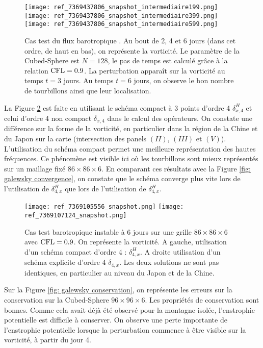 \begin{figure}[htbp]
\begin{center}
\texttt{[image: ref\_7369437806\_snapshot\_intermediaire199.png]}
\texttt{[image: ref\_7369437806\_snapshot\_intermediaire399.png]}
\texttt{[image: ref\_7369437806\_snapshot\_intermediaire599.png]}
\end{center}
\caption{Cas test du flux barotropique \cite{Galewsky2004}. Au bout de 2, 4 et 6 jours (dans cet ordre, de haut en bas), on représente la vorticité. Le paramètre de la Cubed-Sphere est $N=128$, le pas de temps est calculé grâce à la relation $\text{CFL}=0.9$. La perturbation apparaît sur la vorticité au temps $t=3$ jours. Au temps $t=6$ jours, on observe le bon nombre de tourbillons ainsi que leur localisation.}
\label{fig: galewsky 246}
\end{figure}

La Figure \ref{fig: galewsky compact/explicite} est faite en utilisant le schéma compact à 3 points d'ordre 4 $\delta_{x,4}^H$ et celui d'ordre 4 non compact $\delta_{x,4}$ dans le calcul des opérateurs. On constate une différence sur la forme de la vorticité, en particulier dans la région de la Chine et du Japon sur la carte (intersection des panels $(II)$, $(III)$ et $(V)$). L'utilisation du schéma compact permet une meilleure représentation des hautes fréquences. Ce phénomène est visible ici où les tourbillons sont mieux représentés sur un maillage fixé $86 \times 86 \times 6$. En comparant ces résultats avec la Figure \ref{fig: galewsky convergence}, on constate que le schéma converge plus vite lors de l'utilisation de $\delta_{4,x}^H$ que lors de l'utilisation de $\delta_{4,x}^H$.

\begin{figure}[htbp]
\begin{center}
\texttt{[image: ref\_7369105556\_snapshot.png]}
\texttt{[image: ref\_7369107124\_snapshot.png]}
\end{center}
\caption{Cas test barotropique instable \cite{Galewsky2004} à 6 jours sur une grille $86 \times 86 \times 6$ avec $\text{CFL}=0.9$. On représente la vorticité. A gauche, utilisation d'un schéma compact d'ordre 4 : $\delta_{4,x}^H$. A droite utilisation d'un schéma explicite d'ordre 4 $\delta_{4,x}$. Les deux solutions ne sont pas identiques, en particulier au niveau du Japon et de la Chine.}
\label{fig: galewsky compact/explicite}
\end{figure}

Sur la Figure \ref{fig: galewsky conservation}, on représente les erreurs sur la conservation sur la Cubed-Sphere $96 \times 96 \times 6$. Les propriétés de conservation sont bonnes.  Comme cela avait déjà été observé pour la montagne isolée, l'enstrophie potentielle est difficile à conserver. On observe une perte importante de l'enstrophie potentielle lorsque la perturbation commence à être visible sur la vorticité, à partir du jour 4.

